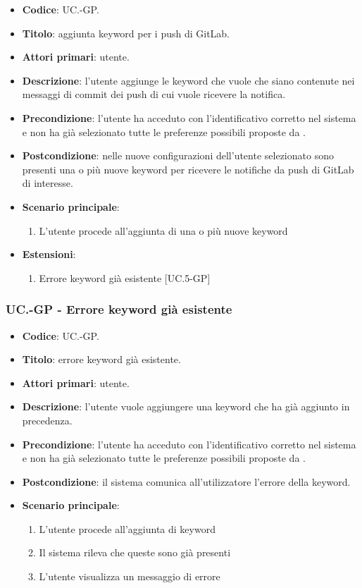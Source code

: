 		\begin{itemize}
			\item \textbf{Codice}: UC\theuccount.\thesubuccount-GP.
			\item \textbf{Titolo}: aggiunta keyword per i push di GitLab.
			\item \textbf{Attori primari}: utente.
			\item \textbf{Descrizione}: l’utente aggiunge le keyword che vuole che siano contenute nei messaggi di commit dei push di cui vuole ricevere la notifica.
			\item \textbf{Precondizione}: l'utente ha acceduto con l'identificativo corretto nel sistema e non ha già selezionato tutte le preferenze possibili proposte da \progetto.
			\item \textbf{Postcondizione}: nelle nuove configurazioni dell'utente selezionato sono presenti una o più nuove keyword per ricevere le notifiche da push di GitLab di interesse.
			\item \textbf{Scenario principale}:
			\begin{enumerate}
				\item L'utente procede all'aggiunta di una o più nuove keyword
			\end{enumerate}
			\item \textbf{Estensioni}:
			\begin{enumerate}
				\item Errore keyword già esistente [UC\theuccount.5-GP]
			\end{enumerate}
		\end{itemize}

	\subsubsection{UC\theuccount.\thesubuccount-GP - Errore keyword già esistente}

	\begin{itemize}
		\item \textbf{Codice}: UC\theuccount.\thesubuccount-GP.
		\item \textbf{Titolo}: errore keyword già esistente.
		\item \textbf{Attori primari}: utente.
		\item \textbf{Descrizione}: l'utente vuole aggiungere una keyword che ha già aggiunto in precedenza.
		\item \textbf{Precondizione}:  l'utente ha acceduto con l'identificativo corretto nel sistema e non ha già selezionato tutte le preferenze possibili proposte da \progetto.
		\item \textbf{Postcondizione}: il sistema comunica all’utilizzatore l’errore della keyword.
		\item \textbf{Scenario principale}:
		\begin{enumerate}
			\item L'utente procede all'aggiunta di keyword
			\item Il sistema rileva che queste sono già presenti
			\item L'utente visualizza un messaggio di errore
		\end{enumerate}
	\end{itemize}

